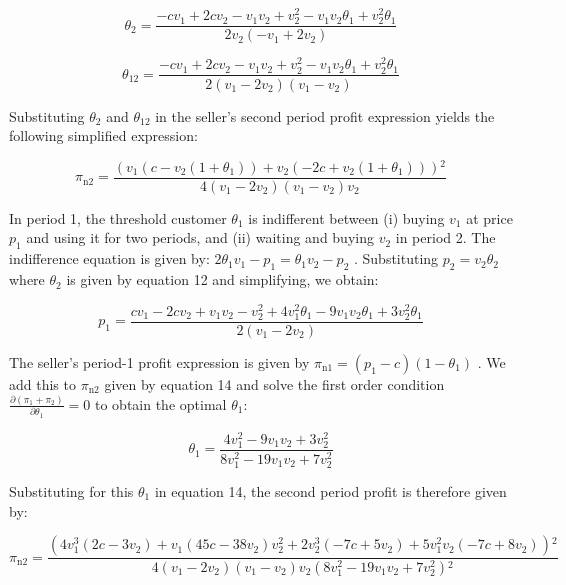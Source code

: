 \documentclass{article}
\begin{document}
\begin{equation}
\theta _2=\frac{-c v_1+2 c v_2-v_1 v_2+v_2^2-v_1 v_2 \theta _1+v_2^2 \theta _1}{2 v_2 \left(-v_1+2 v_2\right)}
\end{equation}

\begin{equation}
\theta _{12}=\frac{-c v_1+2 c v_2-v_1 v_2+v_2^2-v_1 v_2 \theta _1+v_2^2 \theta _1}{2 \left(v_1-2 v_2\right) \left(v_1-v_2\right)}
\end{equation}

Substituting \(\theta _2\) and \(\theta _{12}\) in the seller{'}s second period profit expression yields the following simplified expression:

\begin{equation}
\pi _{\text{n2}}=\frac{\left(v_1 \left(c-v_2 \left(1+\theta _1\right)\right)+v_2 \left(-2 c+v_2 \left(1+\theta _1\right)\right)\right){}^2}{4 \left(v_1-2
v_2\right) \left(v_1-v_2\right) v_2}
\end{equation}

In period 1, the threshold customer \(\theta _1\) is { }indifferent between (i) buying \(v_1\) at price \(p_1\) and using it for two periods, and
(ii) waiting and buying \(v_2\) in period 2. The indifference equation is given by: \(2 \theta _1v_1 - p_1 = \theta _1 v_2 - p_2\) . Substituting
\(p_2=v_2\theta _2\) where \(\theta _2\) is given by equation 12 and simplifying, we obtain:

\begin{equation}
p_1=\frac{c v_1-2 c v_2+v_1 v_2-v_2^2+4 v_1^2 \theta _1-9 v_1 v_2 \theta _1+3 v_2^2 \theta _1}{2 \left(v_1-2 v_2\right)}
\end{equation}

The seller{'}s period-1 profit expression is given by \(\pi _{\text{n1}}=\left(p_1-c\right)\left(1-\theta _1\right)\) . We add this to \(\pi _{\text{n2}}\)
given by equation 14 and solve the first order condition \(\frac{\partial \left(\pi _1+\pi _2\right)}{\partial \theta _1}=0\) to obtain the optimal
\(\theta _1\):

\begin{equation}
\theta _1=\frac{4 v_1^2-9 v_1 v_2+3 v_2^2}{8 v_1^2-19 v_1 v_2+7 v_2^2}
\end{equation}

Substituting for this \(\theta _1\) in equation 14, the second period profit is therefore given by:

\begin{equation}
\pi _{\text{n2}}=\frac{\left(4 v_1^3 \left(2 c-3 v_2\right)+v_1 \left(45 c-38 v_2\right) v_2^2+2 v_2^3 \left(-7 c+5 v_2\right)+5 v_1^2 v_2 \left(-7
c+8 v_2\right)\right){}^2}{4 \left(v_1-2 v_2\right) \left(v_1-v_2\right) v_2 \left(8 v_1^2-19 v_1 v_2+7 v_2^2\right){}^2}
\end{equation}
\end{document}
